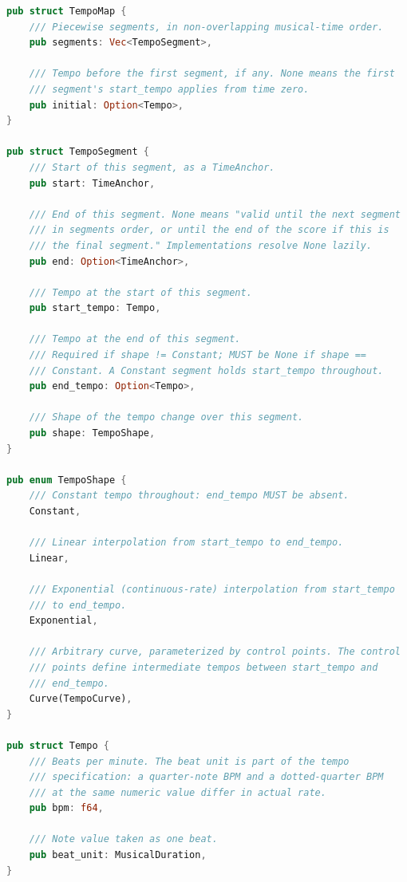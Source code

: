 \documentclass[11pt,letterpaper]{report}
\begin{document}
\begin{lstlisting}[language=Rust]
pub struct TempoMap {
    /// Piecewise segments, in non-overlapping musical-time order.
    pub segments: Vec<TempoSegment>,

    /// Tempo before the first segment, if any. None means the first
    /// segment's start_tempo applies from time zero.
    pub initial: Option<Tempo>,
}

pub struct TempoSegment {
    /// Start of this segment, as a TimeAnchor.
    pub start: TimeAnchor,

    /// End of this segment. None means "valid until the next segment
    /// in segments order, or until the end of the score if this is
    /// the final segment." Implementations resolve None lazily.
    pub end: Option<TimeAnchor>,

    /// Tempo at the start of this segment.
    pub start_tempo: Tempo,

    /// Tempo at the end of this segment.
    /// Required if shape != Constant; MUST be None if shape ==
    /// Constant. A Constant segment holds start_tempo throughout.
    pub end_tempo: Option<Tempo>,

    /// Shape of the tempo change over this segment.
    pub shape: TempoShape,
}

pub enum TempoShape {
    /// Constant tempo throughout: end_tempo MUST be absent.
    Constant,

    /// Linear interpolation from start_tempo to end_tempo.
    Linear,

    /// Exponential (continuous-rate) interpolation from start_tempo
    /// to end_tempo.
    Exponential,

    /// Arbitrary curve, parameterized by control points. The control
    /// points define intermediate tempos between start_tempo and
    /// end_tempo.
    Curve(TempoCurve),
}

pub struct Tempo {
    /// Beats per minute. The beat unit is part of the tempo
    /// specification: a quarter-note BPM and a dotted-quarter BPM
    /// at the same numeric value differ in actual rate.
    pub bpm: f64,

    /// Note value taken as one beat.
    pub beat_unit: MusicalDuration,
}
\end{lstlisting}
\end{document}
